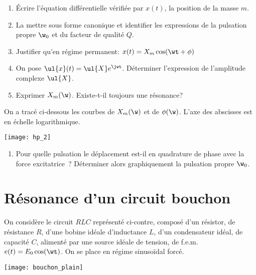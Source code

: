 \documentclass[a4paper, 12pt, final, garamond]{book}
\begin{document}
\begin{enumerate}
    \item Écrire l'équation différentielle vérifiée par $x(t)$, la position de
        la masse $m$.
    \item La mettre sous forme canonique et identifier les expressions de la
        pulsation propre $\w_0$ et du facteur de qualité $Q$.
    \item Justifier qu'en régime permanent: $x(t) = X_m \cos(\wt + \phi)$
    \item On pose $\ul{x}(t) = \ul{X}e^{\jwt}$. Déterminer
        l'expression de l'amplitude complexe $\ul{X}$.
    \item Exprimer $X_m(\w)$. Existe-t-il toujours une résonance?
\end{enumerate}

On a tracé ci-dessous les courbes de $X_m (\w)$ et de
$\phi(\w)$. L'axe des abscisses est en échelle logarithmique.

\begin{center}
    \texttt{[image: hp\_2]}
\end{center}

\begin{enumerate}[start=6]
    \item Pour quelle pulsation le déplacement est-il en quadrature de phase
        avec la force excitatrice~? Déterminer alors graphiquement la pulsation
        propre $\w_0$.
\end{enumerate}

\section{Résonance d'un circuit bouchon}

\begin{minipage}{0.55\linewidth}
    
On considère le circuit $RLC$ représenté ci-contre, composé d'un
résistor, de résistance $R$, d'une bobine idéale d'inductance $L$,
d'un condensateur idéal, de capacité $C$, alimenté par une source
idéale de tension, de f.e.m. $e(t)=E_0\cos(\wt)$. On se place en
régime sinusoïdal forcé.
\end{minipage}
\hfill
\begin{minipage}{0.45\linewidth}
    \begin{center}
        \texttt{[image: bouchon\_plain]}
    \end{center}
\end{minipage}
\end{document}
